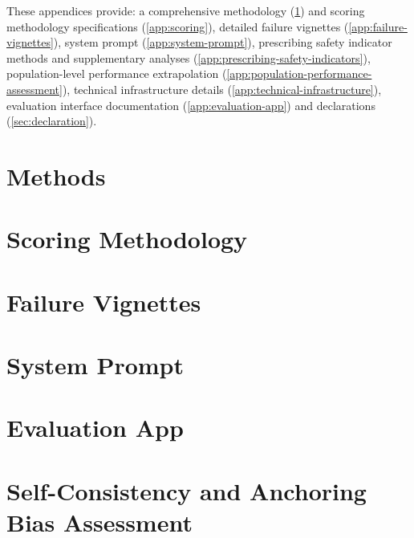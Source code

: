 \documentclass[12pt]{article}
\begin{document}



\clearpage



\clearpage
\begin{appendices}
These appendices provide: a comprehensive methodology (\ref{sec:methods}) and scoring methodology specifications (\ref{app:scoring}), detailed failure vignettes (\ref{app:failure-vignettes}), system prompt (\ref{app:system-prompt}), prescribing safety indicator methods and supplementary analyses (\ref{app:prescribing-safety-indicators}), population-level performance extrapolation (\ref{app:population-performance-assessment}), technical infrastructure details (\ref{app:technical-infrastructure}), evaluation interface documentation (\ref{app:evaluation-app}) and declarations (\ref{sec:declaration}).





\section{Methods}
\label{sec:methods}


\section{Scoring Methodology}


\section{Failure Vignettes}


\clearpage


\clearpage
\section{System Prompt}


\clearpage
\section{Evaluation App}


\clearpage
\section{Self-Consistency and Anchoring Bias Assessment}
\label{sec:self_consistency}



\end{appendices}
\end{document}
